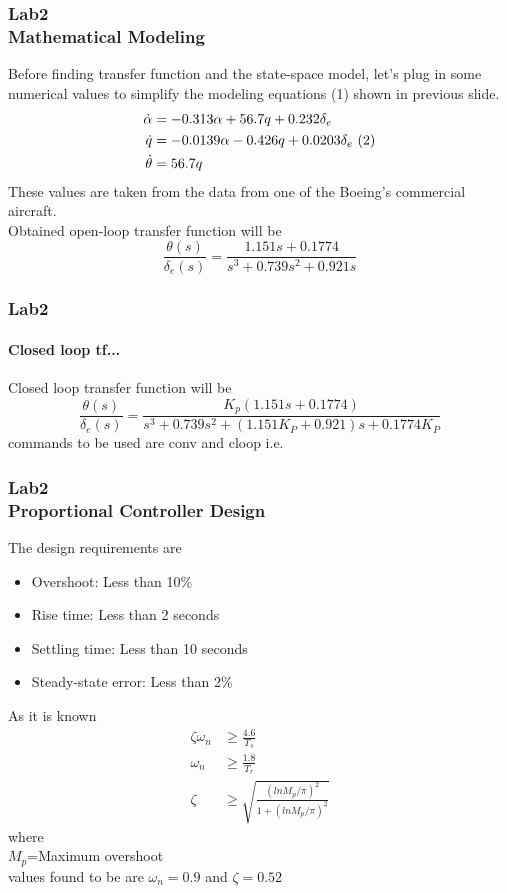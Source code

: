 \documentclass[hyperref={pdfpagelabels=true}]{beamer}
\begin{document}
\begin{frame}
\frametitle{Lab2 \\{\large Mathematical Modeling}}
Before finding transfer function and the state-space model, let's plug in some numerical values to simplify the modeling equations (1) shown in previous slide.
\begin{align*}
\dot{\alpha}&=-0.313\alpha+56.7q+0.232 \delta_e \\ 
\dot{q}&=-0.0139\alpha -0.426q + 0.0203 \delta_e \ \text(2) \\
\dot{\theta}&=56.7 q
\end{align*}
These values are taken from the data from one of the Boeing's commercial aircraft. \\
Obtained open-loop transfer function will be
$$\frac{\theta(s)}{\delta_e(s)}=\frac{1.151s+0.1774}{s^3+0.739s^2+0.921s}$$
\end{frame}


\begin{frame}
\frametitle{Lab2}
\framesubtitle{Closed loop tf... }
Closed loop transfer function will be
$$\frac{\theta(s)}{\delta_e(s)}=\frac{K_p(1.151s+0.1774)}{s^3+0.739s^2+(1.151K_P+0.921)s+0.1774K_P}$$
commands to be used are conv and cloop i.e. \\

\begin{tcolorbox}[title=code  ,width=9.85 cm]

\end{tcolorbox}
\end{frame}




\begin{frame}
\frametitle{Lab2 \\{\large Proportional Controller Design}}
The design requirements are
\begin{itemize}
\item Overshoot: Less than 10\%
\item Rise time: Less than 2 seconds
\item Settling time: Less than 10 seconds
\item Steady-state error: Less than 2\%
\end{itemize}
As it is known
\begin{align*}
\zeta\omega_n &\ge \frac{4.6}{T_s} \\
\omega_n & \ge \frac{1.8}{T_r} \\
\zeta &\ge \sqrt{\frac{(lnM_p/\pi)^2}{1+(lnM_p/\pi)^2}}
\end{align*}
where \\ $M_p$=Maximum overshoot \\
values found to be are $\omega_n=0.9$ and $\zeta=0.52$
\end{frame}
\end{document}
